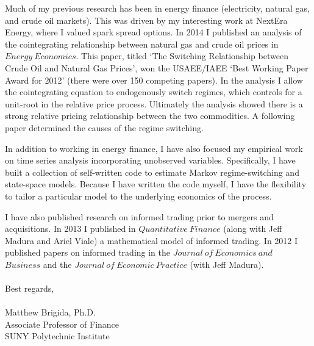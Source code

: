 \documentclass[12pt]{article}
\begin{document}
Much of my previous research has been in energy finance (electricity, natural gas, and crude oil markets).  This was driven by my interesting work at NextEra Energy, where I valued spark spread options.  In 2014 I published an analysis of the cointegrating relationship between natural gas and crude oil prices in $Energy\ Economics$.  This paper, titled `The Switching Relationship between Crude Oil and Natural Gas Prices', won the USAEE/IAEE `Best Working Paper Award for 2012' (there were over 150 competing papers).  In the analysis I allow the cointegrating equation to endogenously switch regimes, which controls for a unit-root in the relative price process. Ultimately the analysis showed there is a strong relative pricing relationship between the two commodities.  A following paper determined the causes of the regime switching.

In addition to working in energy finance, I have also focused my empirical work on time series analysis incorporating unobserved variables.  Specifically, I have built a collection of self-written code to estimate Markov regime-switching and state-space models.  Because I have written the code myself, I have the flexibility to tailor a particular model to the underlying economics of the process.  



I have also published research on informed trading prior to mergers and acquisitions.  In 2013 I published in $Quantitative\ Finance$ (along with Jeff Madura and Ariel Viale) a mathematical model of informed trading.  In 2012 I published papers on informed trading in the $Journal\ of\ Economics\ and$ \\ $ Business$ and the $Journal\ of\ Economic\ Practice$ (with Jeff Madura). 
\\
\\
Best regards,\\
\\
Matthew Brigida, Ph.D.\\
Associate Professor of Finance\\
SUNY Polytechnic Institute
\end{document}
